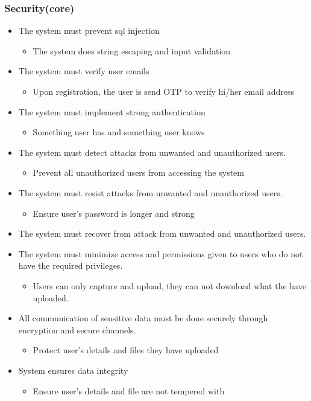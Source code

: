 \documentclass[a4paper,12pt]{article}
\begin{document}
	\subsubsection{Security(core)}
	\begin{itemize}
		\item The system must prevent sql injection
			\begin{itemize}
				\item The system does string escaping and input validation
			\end{itemize}
		\item The system must verify user emails
			\begin{itemize}
				\item Upon registration, the user is send OTP to verify hi/her email address
			\end{itemize}
		\item The system must implement strong authentication
			\begin{itemize}
				\item Something user has and something user knows
			\end{itemize}
		\item The system must detect attacks from unwanted and unauthorized users.
			\begin{itemize}
				\item Prevent all unauthorized users from accessing the system 
			\end{itemize}
		\item The system must resist attacks from unwanted and unauthorized users.
			\begin{itemize}
				\item Ensure user's password is longer and strong
			\end{itemize}
		\item The system must recover from attack from unwanted and unauthorized users.
		
		\item The system must minimize access and permissions given to users who do not have the
			required privileges.
				\begin{itemize}
				\item Users can only capture and upload, they can not download what the have uploaded.
	 
			\end{itemize}
		\item All communication of sensitive data must be done securely through
			encryption and secure channels.
				\begin{itemize}
				\item Protect user's details and files they have uploaded
			\end{itemize}
		\item System ensures data integrity
				\begin{itemize}
				\item Ensure user's details and file are not tempered with 
			\end{itemize}
	\end{itemize}
\end{document}
